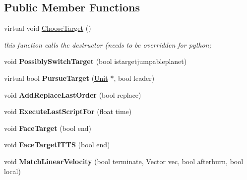 \subsection*{Public Member Functions}
\begin{DoxyCompactItemize}
\item 
virtual void \hyperlink{classOrders_1_1FireAt_aeb4d831d84e41f4cb29eccc23868209f}{Choose\+Target} ()\hypertarget{classOrders_1_1FireAt_aeb4d831d84e41f4cb29eccc23868209f}{}\label{classOrders_1_1FireAt_aeb4d831d84e41f4cb29eccc23868209f}

\begin{DoxyCompactList}\small\item\em this function calls the destructor (needs to be overridden for python; \end{DoxyCompactList}\item 
void {\bfseries Possibly\+Switch\+Target} (bool istargetjumpableplanet)\hypertarget{classOrders_1_1FireAt_ad15f25306a476f32bdc82c86eb25e768}{}\label{classOrders_1_1FireAt_ad15f25306a476f32bdc82c86eb25e768}

\item 
virtual bool {\bfseries Pursue\+Target} (\hyperlink{classUnit}{Unit} $\ast$, bool leader)\hypertarget{classOrders_1_1FireAt_a4abd6e3cb9b20cbb446049101164c307}{}\label{classOrders_1_1FireAt_a4abd6e3cb9b20cbb446049101164c307}

\item 
void {\bfseries Add\+Replace\+Last\+Order} (bool replace)\hypertarget{classOrders_1_1FireAt_abcfefd55ed8872fc3ae5693121f604ae}{}\label{classOrders_1_1FireAt_abcfefd55ed8872fc3ae5693121f604ae}

\item 
void {\bfseries Execute\+Last\+Script\+For} (float time)\hypertarget{classOrders_1_1FireAt_ab1fd773debcb12c146c43c8a6420e075}{}\label{classOrders_1_1FireAt_ab1fd773debcb12c146c43c8a6420e075}

\item 
void {\bfseries Face\+Target} (bool end)\hypertarget{classOrders_1_1FireAt_ae3ffddcd4cc14ed68ba40bb0e8f2fdd5}{}\label{classOrders_1_1FireAt_ae3ffddcd4cc14ed68ba40bb0e8f2fdd5}

\item 
void {\bfseries Face\+Target\+I\+T\+TS} (bool end)\hypertarget{classOrders_1_1FireAt_ae392beed667acb393ef2914e80b78d16}{}\label{classOrders_1_1FireAt_ae392beed667acb393ef2914e80b78d16}

\item 
void {\bfseries Match\+Linear\+Velocity} (bool terminate, Vector vec, bool afterburn, bool local)\hypertarget{classOrders_1_1FireAt_a7c870b68fc11e439e21df0b2b25ac06e}{}\label{classOrders_1_1FireAt_a7c870b68fc11e439e21df0b2b25ac06e}


\end{DoxyCompactItemize}
